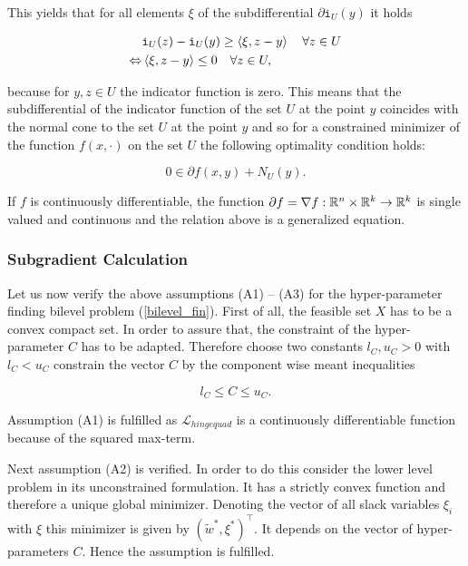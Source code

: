 This yields that for all elements \(\xi\) of the subdifferential \(\partial \mathtt{i}_U(y)\) it holds

\begin{equation*}
\begin{split}
	&\mathtt{i}_U(z)-\mathtt{i}_U(y) \geq \left\langle \xi, z-y\right\rangle \quad \forall z \in U \\
	\Leftrightarrow & \left\langle \xi, z-y\right\rangle \leq 0 \quad \forall z \in U,
\end{split}
\end{equation*}

because for \(y,z \in U\) the indicator function is zero. This means that the subdifferential of the indicator function of the set \(U\) at the point \(y\) coincides with the normal cone to the set \(U\) at the point \(y\) and so for a constrained minimizer of the function \(f(x,\cdot)\) on the set \(U\) the following optimality condition holds:

\[ 0 \in \partial f(x,y) + N_U(y). \]

If \(f\) is continuously differentiable, the function \(\partial f = \nabla f : \mathbb{R}^n\times\mathbb{R}^k \to \mathbb{R}^k\) is single valued and continuous and the relation above is a generalized equation.

\subsubsection{Subgradient Calculation}

Let us now verify the above assumptions (A1) -- (A3) for the hyper-parameter finding bilevel problem (\ref{bilevel_fin}).
First of all, the feasible set \(X\) has to be a convex compact set. In order to assure that, the constraint of the hyper-parameter \(C\) has to be adapted.
Therefore choose two constants \(l_C, u_C > 0\) with \(l_C < u_C\) constrain the vector \(C\) by the component wise meant inequalities

\[ l_C \leq C \leq u_C. \]

Assumption (A1) is fulfilled as \(\mathcal{L}_{hingequad}\) is a continuously differentiable function because of the squared max-term.

Next assumption (A2) is verified. In order to do this consider the lower level problem in its unconstrained formulation.
It has a strictly convex function and therefore a unique global minimizer. Denoting the vector of all slack variables \(\xi_i\) with \(\xi\) this minimizer is given by \((\tilde{w}^*,\xi^*)^{\top}\). It depends on the vector of hyper-parameters \(C\).
Hence the assumption is fulfilled.


